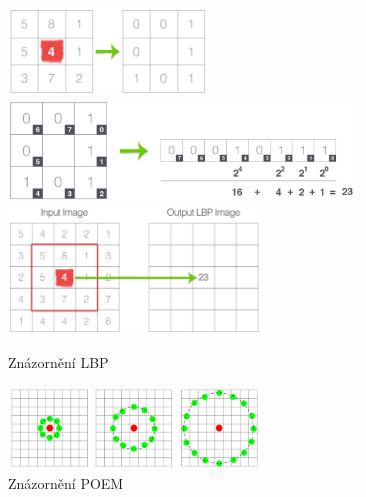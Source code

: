 \documentclass{report}
\begin{document}
\begin{figure}[H]
		\centering
		\includegraphics[width=200px]{./img/lbp_thresholding.jpg}
		\\[0.5cm]	
		\includegraphics[width=350px]{./img/lbp_calculation.jpg}
		\\[0.5cm]
		\includegraphics[width=253px]{./img/lbp_to_output.jpg}	
		\caption{Znázornění LBP}
\end{figure} 
 
\begin{figure}[H]
		\centering
		\includegraphics[width=253px]{./img/poem.png}	
		\caption{Znázornění POEM}
\end{figure}
\end{document}
